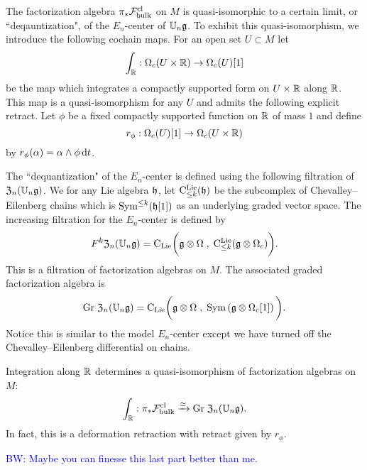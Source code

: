 \documentclass[11pt]{amsart}
\numberwithin{equation}{section}
\def\brian{\textcolor{blue}{BW: }\textcolor{blue}}
\begin{document}
The factorization algebra $\pi_* \mathcal F^{\rm cl}_{\rm bulk}$ on $M$ is quasi-isomorphic to a certain limit, or ``deqauntization", of the $E_n$-center of $\mathbb U_n \mathfrak g$. 
To exhibit this quasi-isomorphism, we introduce the following cochain maps.
For an open set $U \subset M$ let
\[
\int_\mathbb R : \Omega_c(U \times \mathbb R) \to \Omega_c (U) [1] 
\] 
be the map which integrates a compactly supported form on $U \times \mathbb R$ along $\mathbb R$. 
This map is a quasi-isomorphism for any $U $ and admits the following explicit retract. 
Let $\phi$ be a fixed compactly supported function on $\mathbb R$ of mass $1$ and define
\[
r_\phi : \Omega_c(U) [1] \to \Omega_c (U \times \mathbb R)
\]
by $r_\phi (\alpha) = \alpha \wedge \phi \, {\rm d} t$. 

The ``dequantization" of the $E_n$-center is defined using the following filtration of ${\frak Z}_n(\mathbb U_n \mathfrak g)$.
We for any Lie algebra $\mathfrak h$, let ${\rm C}^{\rm Lie}_{\leq k} (\mathfrak h)$ be the subcomplex of Chevalley--Eilenberg chains which is ${\rm Sym}^{\leq k} (\mathfrak h[1])$ as an underlying graded vector space. 
The increasing filtration for the $E_n$-center is defined by
\[
F^k {\frak Z}_n(\mathbb U_n \mathfrak g) = {\rm C}_{{\rm Lie}} \bigg(\mathfrak g \otimes \Omega \; , \; {\rm C}^{\rm Lie}_{\leq k} (\mathfrak g \otimes \Omega_c) \bigg) .
\]
This is a filtration of factorization algebras on $M$. 
The associated graded factorization algebra is
\[
{\rm Gr} \;  {\frak Z}_n(\mathbb U_n \mathfrak g)  = {\rm C}_{{\rm Lie}} \bigg(\mathfrak g \otimes \Omega \; , \; {\rm Sym} \left(\mathfrak g \otimes \Omega_c [1] \right) \bigg) .
\]
Notice this is similar to the model $E_n$-center except we have turned off the Chevalley--Eilenberg differential on chains. 

\begin{lmm}
Integration along $\mathbb R$ determines a quasi-isomorphism of factorization algebras on $M$:
\[
\int_\mathbb R : \pi_* \mathcal F^{\rm cl}_{\rm bulk} \xrightarrow{\simeq} {\rm Gr} \;  {\frak Z}_n(\mathbb U_n \mathfrak g) .
\]
In fact, this is a deformation retraction with retract given by $r_\phi$. 
\end{lmm}
 
\brian{Maybe you can finesse this last part better than me.}

%
%
\end{document}
